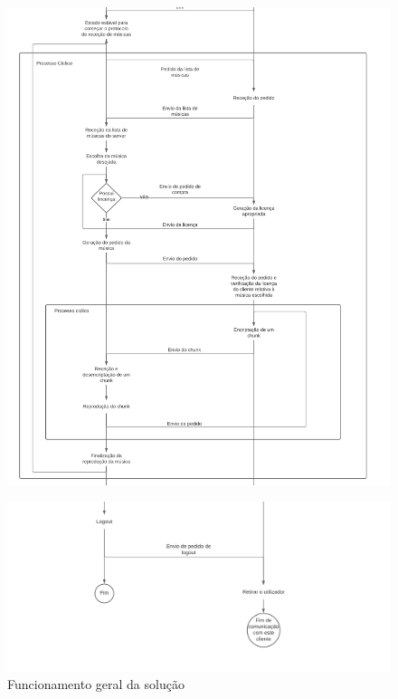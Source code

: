 \documentclass[10pt,english]{article}
\begin{document}
\begin{figure}[!h]
        \centering
        \includegraphics[width=\textwidth]{images/6.png}
\end{figure}

\begin{figure}[!h]
        \centering
        \includegraphics[width=\textwidth]{images/7.png}
        \caption{Funcionamento geral da solução}
\end{figure}

\clearpage
\end{document}
